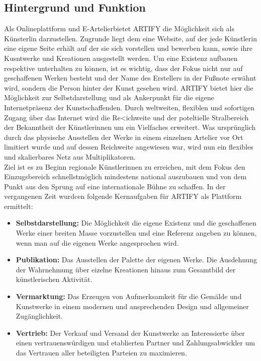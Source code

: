 \documentclass[11pt,a4paper]{report}
\begin{document}
\subsection{Hintergrund und Funktion}
Als Onlineplattform und \glqq E-Artelier\grqq bietet ARTIFY die Möglichkeit sich als Künsterlin darzustellen. Zugrunde liegt dem eine Website, auf der jede Künstlerin eine eigene Seite erhält auf der sie sich vorstellen und bewerben kann, sowie ihre Kusntwerke und Kreationen ausgestellt werden. Um eine Existenz aufbauen respektive unterhalten zu können, ist es wichtig, dass der Fokus nicht nur auf geschaffenen Werken besteht und der Name des Erstellers in der Fußnote erwähnt wird, sondern die Person hinter der Kunst gesehen wird. ARTIFY bietet hier die Möglichkeit zur Selbstdarstellung und als Ankerpunkt für die eigene Internetpräsenz der Kunstschaffenden. Durch weltweiten, flexiblen und sofortigen Zugang über das Internet wird die Re<ichweite und der poteltielle Stralbereich der Bekanntheit der Künstlerinnen um ein Vielfaches erweitert. Was ursprünglich durch das physische Ausstellen der Werke in einem einzelnen Artelier vor Ort limitiert wurde und auf dessen Reichweite angewiesen war, wird nun ein flexibles und skalierbares Netz aus Multiplikatoren.\\
Ziel ist es zu Beginn regionale Künstlerinnen zu erreichen, mit dem Fokus den Einzugsbereich schnellstmöglich mindestens national auszubauen und von dem Punkt aus den Sprung auf eine internationale Bühne zu schaffen. In der vergangenen Zeit wurdcen folgende Kernaufgaben für ARTIFY als Plattform ermittelt: 
\begin{itemize}
    \item \textbf{Selbstdarstellung:} \quad Die Möglichkeit die eigene Existenz und die geschaffenen Werke einer breiten Masse vorzustellen und eine Referenz angeben zu können, wenn man auf die eigenen Werke angesprochen wird.
    \item \textbf{Publikation:} \quad Das Ausstellen der Palette der eigenen Werke. Die Ausdehnung der Wahrnehmung über eizelne Kreationen hinaus zum Gesamtbild der künstlerischen Aktivität.
    \item \textbf{Vermarktung:} \quad Das  Erzeugen von Aufmerksamkeit für die Gemälde und Kunstwerke in einem modernen und ansprechenden Design und allgemeiner Zugänglichkeit.
    \item \textbf{Vertrieb:} \quad Der Verkauf und Versand der Kunstwerke an Interessierte über einen vertrauenswürdigen und etablierten Partner und Zahlungsabwickler um das Vertrauen aller beteiligten Parteien zu maximieren.
    \end{itemize}
\end{document}
